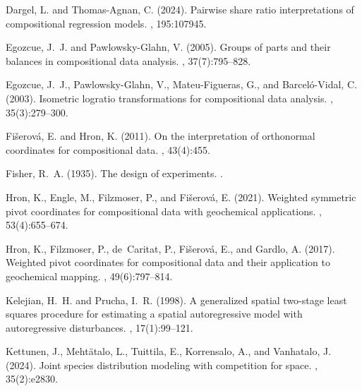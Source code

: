 \documentclass[12pt]{article}
\theoremstyle{plain}
\theoremstyle{definition}
\begin{document}
\begin{thebibliography}{}
	Dargel, L. and Thomas-Agnan, C. (2024).
	\newblock Pairwise share ratio interpretations of compositional regression
	models.
	, 195:107945.
	
	Egozcue, J.~J. and Pawlowsky-Glahn, V. (2005).
	\newblock Groups of parts and their balances in compositional data analysis.
	, 37(7):795--828.
	
	Egozcue, J.~J., {Pawlowsky{-}Glahn}, V., Mateu-Figueras, G., and
	{Barcel{\'o}{-}Vidal}, C. (2003).
	\newblock Isometric logratio transformations for compositional data analysis.
	, 35(3):279--300.
	
	Fi{\v{s}}erov{\'a}, E. and Hron, K. (2011).
	\newblock On the interpretation of orthonormal coordinates for compositional
	data.
	, 43(4):455.
	
	Fisher, R.~A. (1935).
	\newblock The design of experiments.
	.
	
	Hron, K., Engle, M., Filzmoser, P., and Fi{\v{s}}erov{\'a}, E. (2021).
	\newblock Weighted symmetric pivot coordinates for compositional data with
	geochemical applications.
	, 53(4):655--674.
	
	Hron, K., Filzmoser, P., de~Caritat, P., Fi{\v{s}}erov{\'a}, E., and Gardlo, A.
	(2017).
	\newblock Weighted pivot coordinates for compositional data and their
	application to geochemical mapping.
	, 49(6):797--814.
	
	Kelejian, H.~H. and Prucha, I.~R. (1998).
	\newblock A generalized spatial two-stage least squares procedure for
	estimating a spatial autoregressive model with autoregressive disturbances.
	,
	17(1):99--121.
	
	Kettunen, J., Mehtätalo, L., Tuittila, E., Korrensalo, A., and Vanhatalo, J.
	(2024).
	\newblock Joint species distribution modeling with competition for space.
	, 35(2):e2830.
	

\end{thebibliography}
\end{document}
